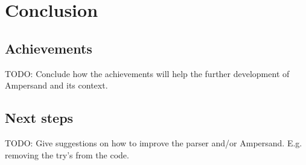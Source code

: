 
\section{Conclusion}
\label{sec:conclusion}

\subsection{Achievements}
TODO: Conclude how the achievements will help the further development of Ampersand and its context.

\subsection{Next steps}
TODO: Give suggestions on how to improve the parser and/or Ampersand. E.g. removing the try's from the code.